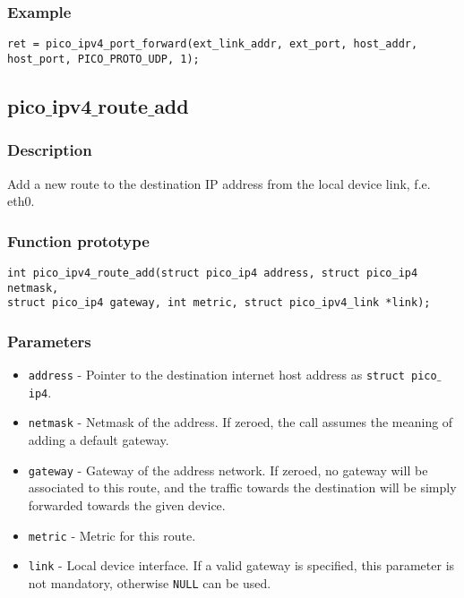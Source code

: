 \subsubsection*{Example}
\begin{verbatim}
ret = pico_ipv4_port_forward(ext_link_addr, ext_port, host_addr,
host_port, PICO_PROTO_UDP, 1);
\end{verbatim}



\subsection{pico$\_$ipv4$\_$route$\_$add}

\subsubsection*{Description}
Add a new route to the destination IP address from the local device link, f.e. eth0.

\subsubsection*{Function prototype}
\begin{verbatim}
int pico_ipv4_route_add(struct pico_ip4 address, struct pico_ip4 netmask,
struct pico_ip4 gateway, int metric, struct pico_ipv4_link *link);
\end{verbatim}

\subsubsection*{Parameters}
\begin{itemize}[noitemsep]
\item \texttt{address} - Pointer to the destination internet host address as \texttt{struct pico$\_$ip4}.
\item \texttt{netmask} - Netmask of the address. If zeroed, the call assumes the meaning of adding a default gateway.
\item \texttt{gateway} - Gateway of the address network. If zeroed, no gateway will be associated to this route, and the traffic towards the destination will be simply forwarded towards the given device.
\item \texttt{metric} - Metric for this route.
\item \texttt{link} - Local device interface. If a valid gateway is specified, this parameter is not mandatory, otherwise \texttt{NULL} can be used.
\end{itemize}

